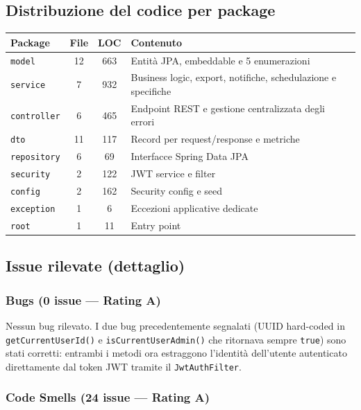 ﻿\documentclass[a4paper,11pt]{article}
\begin{document}
\subsection{Distribuzione del codice per package}

\begin{tabular}{|l|c|c|p{6cm}|}
\hline
\textbf{Package} & \textbf{File} & \textbf{LOC} & \textbf{Contenuto} \\
\hline
\texttt{model} & 12 & 663 & Entit\`a JPA, embeddable e 5 enumerazioni \\
\hline
\texttt{service} & 7 & 932 & Business logic, export, notifiche, schedulazione e specifiche \\
\hline
\texttt{controller} & 6 & 465 & Endpoint REST e gestione centralizzata degli errori \\
\hline
\texttt{dto} & 11 & 117 & Record per request/response e metriche \\
\hline
\texttt{repository} & 6 & 69 & Interfacce Spring Data JPA \\
\hline
\texttt{security} & 2 & 122 & JWT service e filter \\
\hline
\texttt{config} & 2 & 162 & Security config e seed \\
\hline
\texttt{exception} & 1 & 6 & Eccezioni applicative dedicate \\
\hline
\texttt{root} & 1 & 11 & Entry point \\
\hline
\end{tabular}

\subsection{Issue rilevate (dettaglio)}

\subsubsection{Bugs (0 issue --- Rating A)}

Nessun bug rilevato. I due bug precedentemente segnalati (UUID hard-coded in \texttt{getCurrentUserId()} e \texttt{isCurrentUserAdmin()} che ritornava sempre \texttt{true}) sono stati corretti: entrambi i metodi ora estraggono l'identit\`a dell'utente autenticato direttamente dal token JWT tramite il \texttt{JwtAuthFilter}.

\subsubsection{Code Smells (24 issue --- Rating A)}
\end{document}
